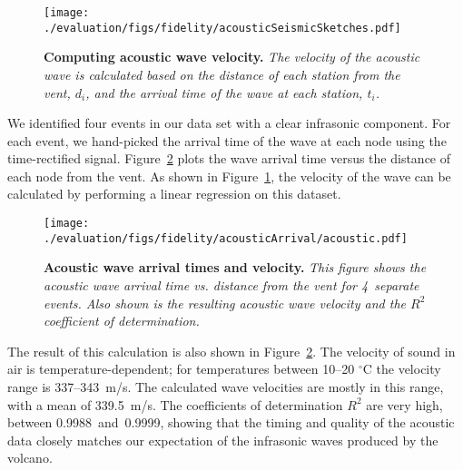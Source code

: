 \begin{figure}[t]
\begin{center}
\texttt{[image: ./evaluation/figs/fidelity/acousticSeismicSketches.pdf]}
\end{center}
\caption{\small{\bf Computing acoustic wave velocity.}  
{\em The velocity of the acoustic wave is calculated based on
the distance of each station from the vent, $d_i$, and the 
arrival time of the wave at each station, $t_i$.}}
\label{fig-acousticSketch}
\end{figure}

We identified four events in our data set with a clear infrasonic
component. For each event, we hand-picked the arrival time of the wave
at each node using the time-rectified signal.
Figure~\ref{fig-acousticArrival} plots the wave arrival time versus
the distance of each node from the vent. As shown in
Figure~\ref{fig-acousticSketch}, the velocity of the wave can be 
calculated by performing a linear regression on this dataset.

\begin{figure}[t]
\begin{center}
\texttt{[image: ./evaluation/figs/fidelity/acousticArrival/acoustic.pdf]}
\end{center}
\caption{\small{\bf Acoustic wave arrival times and velocity.}
{\em This figure shows the acoustic wave arrival time vs. distance
from the vent for 4~separate events. Also shown is the resulting
acoustic wave velocity and the $R^2$ coefficient of determination.}}
\label{fig-acousticArrival}
\end{figure}

The result of this calculation is also shown in
Figure~\ref{fig-acousticArrival}.  The velocity of sound in air is
temperature-dependent; for temperatures between 10--20 $^{\circ}$C
the velocity range is 337--343~m/s.  The calculated wave velocities are
mostly in this range, with a mean of 339.5~m/s. The coefficients of
determination $R^2$ are very high, between
0.9988~and~0.9999, showing that the timing and quality of the
acoustic data closely matches our expectation
of the infrasonic waves produced by the volcano.

